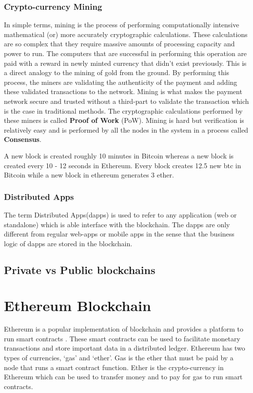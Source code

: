 \documentclass[11pt,openright]{report}
\begin{document}
\subsubsection{Crypto-currency Mining}\label{crypto-mining}
In simple terms, mining is the process of performing computationally intensive mathematical (or) more accurately cryptographic calculations. These calculations are so complex that they require massive amounts of processing capacity and power to run. The computers that are successful in performing this operation are paid with a reward in newly minted currency that didn't exist previously. This is a direct analogy to the mining of gold from the ground. By performing this process, the miners are validating the authenticity of the payment and adding these validated transactions to the network. Mining is what makes the payment network secure and trusted without a third-part to validate the transaction which is the case in traditional methods. The cryptographic calculations performed by these miners is called \textbf{Proof of Work} (PoW). Mining is hard but verification is relatively easy and is performed by all the nodes in the system in a process called \textbf{Consensus}.

A new block is created roughly 10 minutes in Bitcoin whereas a new block is created every 10 - 12 seconds in Ethereum. Every block creates 12.5 new btc in Bitcoin while a new block in ethereum generates 3 ether.

\subsubsection{Distributed Apps}
The term Distributed Apps(dapps) is used to refer to any application (web or standalone) which is able interface with the blockchain. 
The dapps are only different from regular web-apps or mobile apps in the sense that the business logic of dapps are stored in the blockchain.

\subsection{Private vs Public blockchains}



\section{Ethereum Blockchain}
Ethereum is a popular implementation of blockchain and provides a platform to run smart contracts \cite{buterin2013whitepaper}. These smart contracts can be used to facilitate monetary transactions and store important data in a distributed ledger. Ethereum has two types of currencies, ‘gas’ and ‘ether’. Gas is the ether that must be paid by a node that runs a smart contract function. Ether is the crypto-currency in Ethereum which can be used to transfer money and to pay for gas to run smart contracts.
\end{document}
